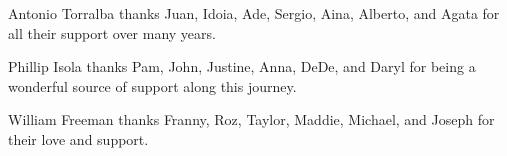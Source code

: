 Antonio Torralba thanks Juan, Idoia, Ade, Sergio, Aina, Alberto, and Agata for all their support over many years.


Phillip Isola thanks Pam, John, Justine, Anna, DeDe, and Daryl for being a wonderful source of support along this journey.

William Freeman thanks Franny, Roz, Taylor, Maddie, Michael, and Joseph for their love and support.

